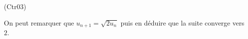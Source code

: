 \begin{tiny}(Ctr03)\end{tiny} On peut remarquer que $u_{n+1} = \sqrt{2u_n}$ puis en déduire que la suite converge vers $2$.
